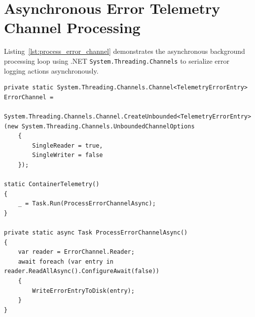 \section{Asynchronous Error Telemetry Channel Processing}
Listing~\ref{lst:process_error_channel} demonstrates the asynchronous background processing loop using .NET \texttt{System.\allowbreak Threading.\allowbreak Channels} to serialize error logging actions asynchronously.

\begin{lstlisting}[language=CSharp, caption={Asynchronous Channel Telemetry consumer loop}, label={lst:process_error_channel}]
private static System.Threading.Channels.Channel<TelemetryErrorEntry> ErrorChannel =
    System.Threading.Channels.Channel.CreateUnbounded<TelemetryErrorEntry>(new System.Threading.Channels.UnboundedChannelOptions
    {
        SingleReader = true,
        SingleWriter = false
    });

static ContainerTelemetry()
{
    _ = Task.Run(ProcessErrorChannelAsync);
}

private static async Task ProcessErrorChannelAsync()
{
    var reader = ErrorChannel.Reader;
    await foreach (var entry in reader.ReadAllAsync().ConfigureAwait(false))
    {
        WriteErrorEntryToDisk(entry);
    }
}
\end{lstlisting}
